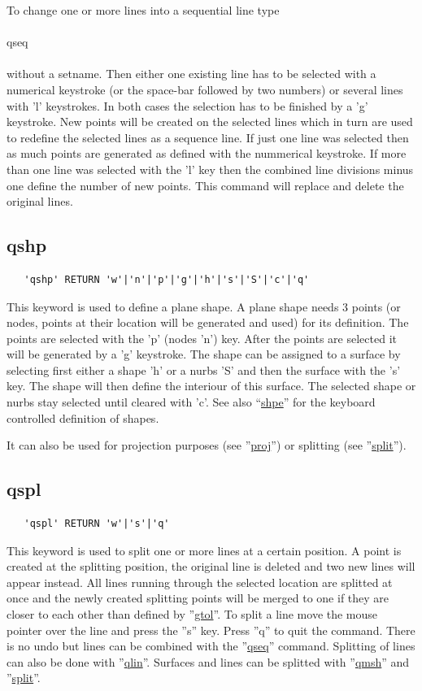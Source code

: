 \documentclass{article}
\providecommand{\htmlref}[2]{\hyperref[#2]{#1}}
\begin{document}
To change one or more lines into a sequential line type\\\\qseq\\\\without a setname. Then either one existing line has to be selected with a numerical keystroke (or the space-bar followed by two numbers) or several lines with 'l' keystrokes. In both cases the selection has to be finished by a 'g' keystroke. New points will be created on the selected lines which in turn are used to redefine the selected lines as a sequence line. If just one line was selected then as much points are generated as defined with the nummerical keystroke. If more than one line was selected with the 'l' key then the combined line divisions minus one define the number of new points. This command will replace and delete the original lines.

\subsection{\label{qshp}qshp}
\begin{verbatim}
   'qshp' RETURN 'w'|'n'|'p'|'g'|'h'|'s'|'S'|'c'|'q'
\end{verbatim}
This keyword is used to define a plane shape. A plane shape needs 3 points (or nodes, points at their location will be generated and used) for its definition. The points are selected with the 'p' (nodes 'n') key. After the points are selected it will be generated by a 'g' keystroke. The shape can be assigned to a surface by selecting first either a shape 'h' or a nurbs 'S' and then the surface with the 's' key. The shape will then define the interiour of this surface. The selected shape or nurbs stay selected until cleared with 'c'. See also ``\htmlref{shpe}{shpe}'' for the keyboard controlled definition of shapes.

It can also be used for projection purposes (see ''\htmlref{proj}{proj}'') or splitting (see ''\htmlref{split}{split}'').

\subsection{\label{qspl}qspl}
\begin{verbatim}
   'qspl' RETURN 'w'|'s'|'q' 
\end{verbatim}
This keyword is used to split one or more lines at a certain position. A point is created at the splitting position, the original line is deleted and two new lines will appear instead. All lines running through the selected location are splitted at once and the newly created splitting points will be merged to one if they are closer to each other than defined by ''\htmlref{gtol}{gtol}''. To split a line move the mouse pointer over the line and press the ''s'' key. Press ''q'' to quit the command. There is no undo but lines can be combined with the ''\htmlref{qseq}{qseq}'' command. Splitting of lines can also be done with ''\htmlref{qlin}{qlin}''. Surfaces and lines can be splitted with ''\htmlref{qmsh}{qmsh}'' and ''\htmlref{split}{split}''.
\end{document}
